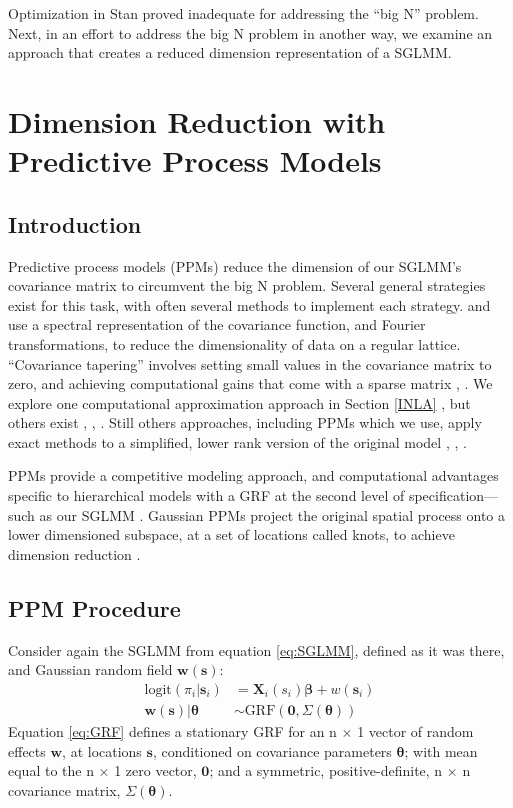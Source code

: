 Optimization in Stan proved inadequate for addressing the ``big N'' problem. Next, in an effort to address the big N problem in another way, we examine an approach that creates a reduced dimension representation of a SGLMM. 

\section{Dimension Reduction with Predictive Process Models} \label{ppm} 

\subsection{Introduction} %

Predictive process models (PPMs) reduce the dimension of our SGLMM's covariance matrix to circumvent the big N problem. Several general strategies exist for this task, with often several methods to implement each strategy. \cite{Fuentes2007} and \cite{Paciorek2007} use a spectral representation of the covariance function, and Fourier transformations, to reduce the dimensionality of data on a regular lattice. ``Covariance tapering'' involves setting small values in the covariance matrix to zero, and achieving computational gains that come with a sparse matrix \citep{Furrer2006}, \citep{Kaufman2008}. We explore one computational approximation approach in Section \ref{INLA} \citep{Rue2009}, but others exist \citep{Stein2004}, \citep{Eidsvik2014}, \citep{Aune2014}. Still others approaches, including PPMs which we use, apply exact methods to a simplified, lower rank version of the original model \citep{Cressie2008}, \citep{Higdon2002}, \citep{Eidsvik2012}.

PPMs provide a competitive modeling approach, and computational advantages specific to hierarchical models with a GRF at the second level of specification---such as our SGLMM \citep{Banerjee2008}. Gaussian PPMs project the original spatial process onto a lower dimensioned subspace, at a set of locations called knots, to achieve dimension reduction \citep{Banerjee2008}. 

\subsection{PPM Procedure}
Consider again the SGLMM from equation \ref{eq:SGLMM}, defined as it was there, and Gaussian random field $\pmb{w}(\pmb{s})$:
\begin{align}
\text{logit}(\pi_{i}|\pmb{s}_{i}) &= \pmb{X}_{i}(s_{i}) \pmb{\beta} + w(\pmb{s}_{i}) \label{eq:orig} \\
\pmb{w}(\pmb{s}) | \pmb{\theta} &\sim \text{GRF}(\pmb{0}, \Sigma(\pmb{\theta})) \label{eq:GRF}
\end{align}
Equation \ref{eq:GRF} defines a stationary GRF for an n $\times$ 1 vector of random effects $\pmb{w}$, at locations $\pmb{s}$, conditioned on covariance parameters $\pmb{\theta}$; with mean equal to the n $\times$ 1 zero vector, $\pmb{0}$; and a symmetric, positive-definite, n $\times$ n covariance matrix, $\Sigma(\pmb{\theta})$.

